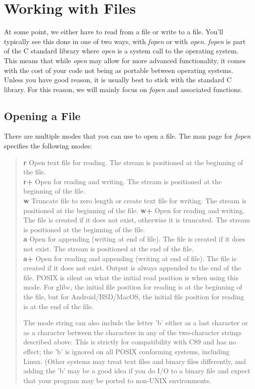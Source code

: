 \documentclass[../main.tex]{subfiles}
\begin{document}
	
	\chapter{Working with Files}
	At some point, we either have to read from a file or write to a file.  You'll typically see this done in one of two ways, with \textit{fopen} or with \textit{open}.  \textit{fopen} is part of the C standard library where \textit{open} is a system call to the operating system.  This means that while \textit{open} may allow for more advanced functionality, it comes with the cost of your code not being as portable between operating systems.  Unless you have good reason, it is usually best to stick with the standard C library.  For this reason, we will mainly focus on \textit{fopen} and associated functions.

	\section{Opening a File}
	There are multiple modes that you can use to open a file.  The man page for \textit{fopen} specifies the following modes:
	
	\begin{quote}
		\textbf{r} \quad Open text file for reading.  The stream is positioned at the beginning of the file.\\
		\textbf{r+} \quad Open for reading and writing.  The stream is positioned at the beginning of the file.\\
		\textbf{w} \quad Truncate file to zero length or create text file for writing.  The stream is positioned at the beginning of the file.
		\textbf{w+} \quad Open for reading and writing.  The file is created if it does not exist, otherwise it is truncated.  The stream is positioned at the beginning of the file.\\
		\textbf{a} \quad Open for appending (writing at end of file).  The file is created if it does not exist.  The stream is positioned at the end of the file.\\
		\textbf{a+} \quad Open  for  reading  and  appending (writing at end of file).  The file is created if it does not exist.  Output is always appended to the end of the file.  POSIX is silent on what the initial read position is when using this mode.  For glibc, the initial file position for reading is at the beginning of the file, but for Android/BSD/MacOS, the initial file position for  reading  is at the end of the file.
		
		The mode string can also include the letter 'b' either as a last character or as a character between the characters in any of the two-character strings described above.  This is strictly for compatibility with C89 and has no effect; the 'b' is ignored on all POSIX conforming systems, including Linux.  (Other systems may treat text files and binary files differently, and adding the 'b' may  be a good idea if you do I/O to a binary file and expect that your program may be ported to non-UNIX environments.
	\end{quote} 
\end{document}
